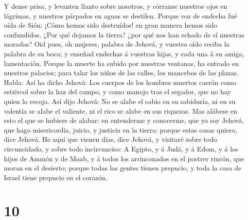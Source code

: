 Y dense prisa, y levanten llanto sobre nosotros, y córranse nuestros
ojos en lágrimas, y nuestros párpados en aguas se destilen.
 Porque voz de endecha fué oída de Sión: ¡Cómo hemos sido
destruídos! en gran manera hemos sido confundidos. ¿Por qué dejamos la
tierra? ¿por qué nos han echado de sí nuestras moradas? 
Oid pues, oh mujeres, palabra de Jehová, y vuestro oído reciba la
palabra de su boca; y enseñad endechas á vuestras hijas, y cada una á su
amiga, lamentación.  Porque la muerte ha subido por
nuestras ventanas, ha entrado en nuestros palacios; para talar los niños
de las calles, los mancebos de las plazas.  Habla: Así ha
dicho Jehová: Los cuerpos de los hombres muertos caerán como estiércol
sobre la haz del campo, y como manojo tras el segador, que no hay quien
lo recoja.  Así dijo Jehová: No se alabe el sabio en su
sabiduría, ni en su valentía se alabe el valiente, ni el rico se alabe
en sus riquezas.  Mas alábese en esto el que se hubiere de
alabar: en entenderme y conocerme, que yo soy Jehová, que hago
misericordia, juicio, y justicia en la tierra: porque estas cosas
quiero, dice Jehová.  He aquí que vienen días, dice Jehová,
y visitaré sobre todo circuncidado, y sobre todo incircunciso:
 A Egipto, y á Judá, y á Edom, y á los hijos de Ammón y de
Moab, y á todos los arrinconados en el postrer rincón, que moran en el
desierto; porque todas las gentes tienen prepucio, y toda la casa de
Israel tiene prepucio en el corazón.

\hypertarget{section-9}{%
\section{10}\label{section-9}}

